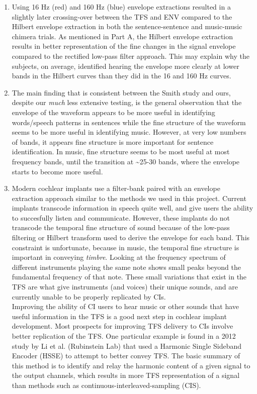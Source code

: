 \documentclass[9pt]{extarticle}
\begin{document}
\begin{enumerate}[label = \alph*)]
\begin{center}
\end{center}

\item Using 16 Hz (red) and 160 Hz (blue) envelope extractions resulted in a slightly later crossing-over between the TFS and ENV compared to the Hilbert envelope extraction in both the sentence-sentence and music-music chimera trials. As mentioned in Part A, the Hilbert envelope extraction results in better representation of the fine changes in the signal envelope compared to the rectified low-pass filter approach. This may explain why the subjects, on average, identified hearing the envelope more clearly at lower bands in the Hilbert curves than they did in the 16 and 160 Hz curves.  

\item The main finding that is consistent between the Smith study and ours, despite our \textit{much} less extensive testing, is the general observation that the envelope of the waveform appears to be more useful in identifying words/speech patterns in sentences while the fine structure of the waveform seems to be more useful in identifying music. However, at very low numbers of bands, it appears fine structure is more important for sentence identification. In music, fine structure seems to be most useful at most frequency bands, until the transition at \textasciitilde 25-30 bands, where the envelope starts to become more useful.

\item Modern cochlear implants use a filter-bank paired with an envelope extraction approach similar to the methods we used in this project. Current implants transcode information in speech quite well, and give users the ability to succesfully listen and communicate. However, these implants do not transcode the temporal fine structure of sound because of the low-pass filtering or Hilbert transform used to derive the envelope for each band. This constraint is unfortunate, because in music, the temporal fine structure is important in conveying \textit{timbre}. Looking at the frequency spectrum of different instruments playing the same note shows small peaks beyond the fundamental frequency of that note. These small variations that exist in the TFS are what give instruments (and voices) their unique sounds, and are currently unable to be properly replicated by CIs. \\

Improving the ability of CI users to hear music or other sounds that have useful information in the TFS is a good next step in cochlear implant development. Most prospects for improving TFS delivery to CIs involve better replication of the TFS. One particular example is found in a 2012 study by Li et al. (Rubinstein Lab) that used a Harmonic Single Sideband Encoder (HSSE) to attempt to better convey TFS. The basic summary of this method is to identify and relay the harmonic content of a given signal to the output channels, which results in more TFS representation of a signal than methods such as continuous-interleaved-sampling (CIS). 
\end{enumerate}
\end{document}
